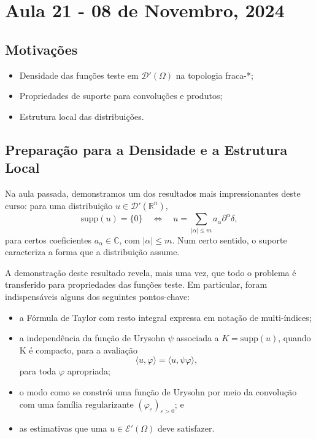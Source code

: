 \documentclass[../distribution_theory_notes.tex]{subfiles}
\begin{document}
\section{Aula 21 - 08 de Novembro, 2024}
\subsection{Motivações}
\begin{itemize}
	\item Densidade das funções teste em \(\mathcal{D}'(\Omega )\) na topologia fraca-*;
	\item Propriedades de suporte para convoluções e produtos;
	\item Estrutura local das distribuições.
\end{itemize}
\subsection{Preparação para a Densidade e a Estrutura Local}
Na aula passada, demonstramos um dos resultados mais impressionantes deste curso: para uma distribuição \(u\in \mathcal{D}'(\mathbb{R}^{n})\),
\[
	\mathrm{supp}(u)=\{0\}\quad\Longleftrightarrow\quad u=\sum\limits_{| \alpha  |\leq m}^{}a_{\alpha }\partial^{\alpha }\delta,
\]
para certos coeficientes \(a_{\alpha }\in \mathbb{C}\), com \(| \alpha  |\leq m\). Num certo sentido, o suporte caracteriza a forma que a distribuição assume.

A demonstração deste resultado revela, mais uma vez, que todo o problema é transferido para propriedades das funções teste. Em particular, foram indispensáveis alguns dos seguintes pontos-chave:
\begin{itemize}
	\item[(i)] a Fórmula de Taylor com resto integral expressa em notação de multi-índices;
	\item[(ii)] a independência da função de Urysohn \(\psi \) associada a \(K=\mathrm{supp}(u)\), quando K é compacto, para a avaliação
	      \[
		      \langle u, \varphi  \rangle=\langle u, \psi \varphi  \rangle,
	      \]
	      para toda \(\varphi \) apropriada;
	\item[(iii)] o modo como se constrói uma função de Urysohn por meio da convolução com uma família regularizante \((\varphi_{\varepsilon })_{\varepsilon >0}\); e
	\item[(iv)] as estimativas que uma \(u\in \mathcal{E}'(\Omega )\) deve satisfazer.
\end{itemize}
\end{document}

